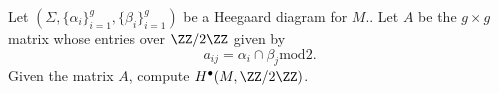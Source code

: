 

    Let $(\Sigma, \{\alpha_i\}_{i=1}^g, \{\beta_i\}_{i=1}^g)$ be a Heegaard diagram for $M$.. Let $A$ be the $g\times g$ matrix whose entries over $\ZZ/2\ZZ$ given by  
    \[a_{ij}=\alpha_{i}\cap \beta_j \text{mod} 2.\] 
    Given the matrix $A$, compute $H^\bullet(M, \ZZ/2\ZZ)$.


